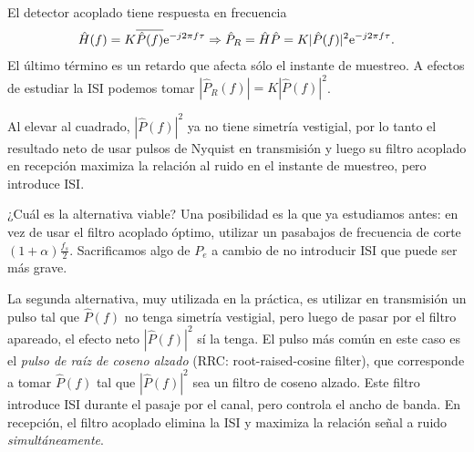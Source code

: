 \begin{ejemplo}

El detector acoplado tiene respuesta en frecuencia
\begin{gather*}
 \hat{H}(f) = K \overline{\hat{P}(f)} \mathrm{e}^{-j2\pi f\tau} \Rightarrow \hat{P}_R = \hat{H}\hat{P} = K |\hat{P}(f)|^2 \mathrm{e}^{-j2\pi f \tau}.
\end{gather*}
El último término es un retardo que afecta sólo el instante de muestreo. A efectos de estudiar la ISI podemos tomar $|\hat{P}_R(f)| = K|\hat{P}(f)|^2$.

 \begin{center}
 \end{center}

Al elevar al cuadrado, $|\hat{P}(f)|^2$ ya no tiene simetría vestigial, por lo tanto el resultado neto de usar pulsos de Nyquist en transmisión y luego su filtro acoplado en recepción maximiza la relación al ruido en el instante de muestreo, pero introduce ISI.

¿Cuál es la alternativa viable? Una posibilidad es la que ya estudiamos antes: en vez de usar el filtro acoplado óptimo, utilizar un pasabajos de frecuencia de corte $(1+\alpha)\frac{f_s}{2}$. Sacrificamos algo de $P_e$ a cambio de no introducir ISI que puede ser más grave.

La segunda alternativa, muy utilizada en la práctica, es utilizar en transmisión un pulso tal que $\hat{P}(f)$ no tenga simetría vestigial, pero luego de pasar por el filtro apareado, el efecto neto $|\hat{P}(f)|^2$ sí la tenga. El pulso más común en este caso es el \emph{pulso de raíz de coseno alzado} (RRC: root-raised-cosine filter), que corresponde a tomar $\hat{P}(f)$ tal que $|\hat{P}(f)|^2$ sea un filtro de coseno alzado. Este filtro introduce ISI durante el pasaje por el canal, pero controla el ancho de banda. En recepción, el filtro acoplado elimina la ISI y maximiza la relación señal a ruido \emph{simultáneamente}. 
\end{ejemplo}

